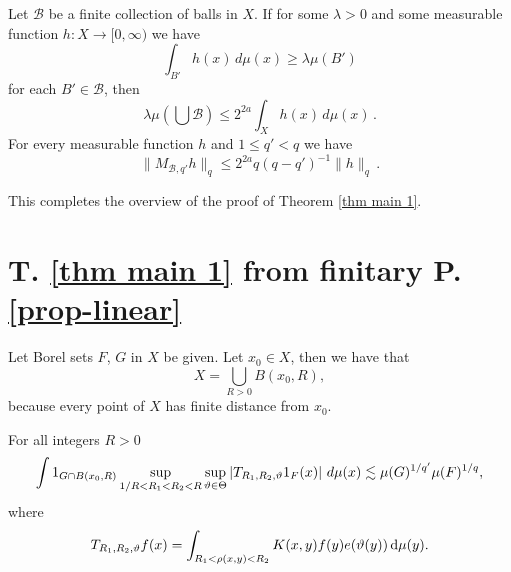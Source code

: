 \begin{prop}\label{prop hlm}
    Let $\mathcal{B}$ be a finite collection of balls in $X$.
If for some $\lambda>0$ and some measurable function $h:X\to [0,\infty)$ we have
\begin{equation}\label{eq ball assumption}
\int_{B'} h(x)\, d\mu(x)\ge \lambda \mu(B')
\end{equation}
    for each $B'\in \mathcal{B}$,
    then
    \begin{equation}\label{eq besico}
\lambda \mu(\bigcup \mathcal{B}) \le 2^{2a}\int_X h(x)\, d\mu(x)\, .
        \end{equation}
For every measurable function $h$ 
and $1\le q'<q$ we have 
\begin{equation}\label{eq hlm}
    \|M_{\mathcal{B},q'} h\|_q\le 2^{2a}q(q-q')^{-1} \|h\|_q\, .
\end{equation}


\end{prop}


This completes the overview of the proof of Theorem
\ref{thm main 1}.


\chapter{T. \ref{thm main 1} from finitary P.
\ref{prop-linear}}
\label{thmfromproplinear}


Let Borel sets $F$, $G$ in $X$ be given.
Let $x_0\in X$, then we have that
\begin{equation}
    X=\bigcup_{R>0}B(x_0,R),
\end{equation} because every point of $X$
has finite distance from $x_0$.
\begin{lemma}\label{lemmarcut}
For all integers $R>0$
    \begin{equation} \label{Rcut}
    \int 1_{G\cap B(x_0,R)}
\sup_{1/R<R_1<R_2<R}\sup_{\vartheta\in\Theta}
\left| T_{R_1,R_2,\vartheta} 1_{F}(x) \right|\, d\mu(x)
\lesssim \mu(G)^{1/q'} \mu(F)^{1/q},
\end{equation}
where
\begin{equation}\label{TRR}
    T_{R_1,R_2,\vartheta} f(x)=
\int_{R_1 <  \rho(x,y) < R_2}  K(x,y) f(y) e(\vartheta(y)) \, \mathrm{d}\mu(y) .
\end{equation}
\end{lemma}

